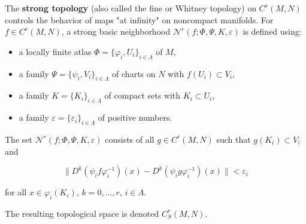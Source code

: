 The \textbf{strong topology} (also called the fine or Whitney topology) on $C^r(M,N)$ controls the behavior of maps "at infinity" on noncompact manifolds. For $f \in C^r(M,N)$, a strong basic neighborhood $\mathcal{N}^r(f; \Phi, \Psi, K, \varepsilon)$ is defined using:

\begin{itemize}
\item a locally finite atlas $\Phi = \{\varphi_i, U_i\}_{i \in \Lambda}$ of $M$,
\item a family $\Psi = \{\psi_i, V_i\}_{i \in \Lambda}$ of charts on $N$ with $f(U_i) \subset V_i$,
\item a family $K = \{K_i\}_{i \in \Lambda}$ of compact sets with $K_i \subset U_i$,
\item a family $\varepsilon = \{\varepsilon_i\}_{i \in \Lambda}$ of positive numbers.
\end{itemize}

The set $\mathcal{N}^r(f; \Phi, \Psi, K, \varepsilon)$ consists of all $g \in C^r(M,N)$ such that $g(K_i) \subset V_i$ and

$$\| D^k(\psi_i f \varphi_i^{-1})(x) - D^k(\psi_i g \varphi_i^{-1})(x) \| < \varepsilon_i$$

for all $x \in \varphi_i(K_i)$, $k = 0, \ldots, r$, $i \in \Lambda$.

The resulting topological space is denoted $C^r_S(M, N)$.
